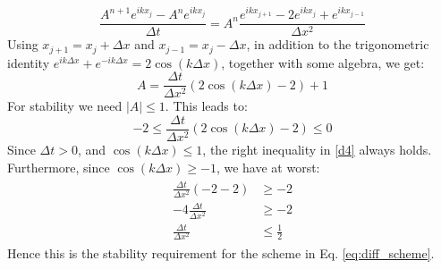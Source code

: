 \begin{equation}
    \frac{A^{n+1}e^{i k x_j} - A^n e^{i k x_{j}}}{\Delta t} = A^n \frac{e^{i k x_{j+1}} - 2e^{i k x_j} + e^{i k x_{j-1}}}{\Delta x^2} 
\end{equation}
Using $x_{j+1} = x_j +\Delta x$ and $x_{j-1} = x_j -\Delta x$, in addition to the trigonometric identity $e^{ik\Delta x} + e^{-ik \Delta x} = 2\cos (k\Delta x)$, together with some algebra, we get:
\begin{equation}
    A = \frac{\Delta t}{\Delta x^2}(2 \cos(k \Delta x) - 2) + 1    
\end{equation}
For stability we need $|A| \leq 1$.
This leads to:
\begin{equation}\label{d4}
    -2 \leq \frac{\Delta t}{\Delta x^2}(2 \cos(k \Delta x) - 2) \leq 0
\end{equation}
Since $\Delta t > 0$, and $\cos(k \Delta x) \leq 1$, the right inequality in \ref{d4} always holds.
Furthermore, since $\cos(k \Delta x) \geq -1$, we have at worst:
\begin{align}
\begin{split}
    \frac{\Delta t}{\Delta x^2}(-2 - 2) &\geq -2 \\
    -4\frac{\Delta t}{\Delta x^2} &\geq -2 \\
    \frac{\Delta t}{\Delta x^2} &\leq \frac{1}{2}
\end{split}
\end{align}
Hence this is the stability requirement for the scheme in Eq. \ref{eq:diff_scheme}.